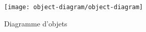 \begin{figure}[ht]
    \centering
    \caption{Diagramme d'objets}
    \texttt{[image: object-diagram/object-diagram]}
    \label{fig:object-diagram}
\end{figure}
\pagebreak


